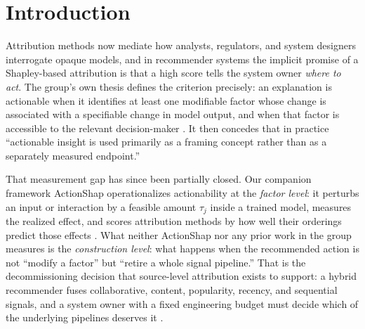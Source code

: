 \documentclass[pdflatex,sn-mathphys-num]{sn-jnl}
\theoremstyle{thmstyleone}%
\theoremstyle{thmstyletwo}%
\theoremstyle{thmstylethree}%
\begin{document}

\maketitle

\section{Introduction}\label{sec1}

Attribution methods now mediate how analysts, regulators, and system designers interrogate opaque models, and in recommender systems the implicit promise of a Shapley-based attribution is that a high score tells the system owner \emph{where to act}. The group's own thesis defines the criterion precisely: an explanation is actionable when it identifies at least one modifiable factor whose change is associated with a specifiable change in model output, and when that factor is accessible to the relevant decision-maker \cite{louhichi2026thesis}. It then concedes that in practice ``actionable insight is used primarily as a framing concept rather than as a separately measured endpoint.''

That measurement gap has since been partially closed. Our companion framework ActionShap operationalizes actionability at the \emph{factor level}: it perturbs an input or interaction by a feasible amount $\tau_j$ inside a trained model, measures the realized effect, and scores attribution methods by how well their orderings predict those effects \cite{louhichi2026actionshap}. What neither ActionShap nor any prior work in the group measures is the \emph{construction level}: what happens when the recommended action is not ``modify a factor'' but ``retire a whole signal pipeline.'' That is the decommissioning decision that source-level attribution exists to support: a hybrid recommender fuses collaborative, content, popularity, recency, and sequential signals, and a system owner with a fixed engineering budget must decide which of the underlying pipelines deserves it \cite{louhichi2026signalshap}.
\end{document}
